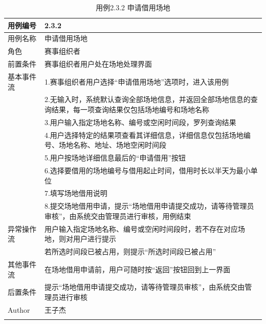 \documentclass[a4paper,UTF8]{article}
\begin{document}
\begin{table}[H]
	\begin{center}
		\caption{用例2.3.2 申请借用场地}
		\label{table:Tab_uc232}
		\begin{tabular}{|p{}|p{}|}
			\hline\noalign{\smallskip}
			用例编号 & 2.3.2\\
			\hline
			用例名称 &  申请借用场地\\
			\hline
			角色 & 赛事组织者\\
			\hline
			前置条件 & 赛事组织者用户处在场地处理界面\\
			\hline
			基本事件流 & 1.赛事组织者用户选择“申请借用场地”选项时，进入该用例 \\& 2.无输入时，系统默认查询全部场地信息，并返回全部场地信息的查询结果，每一项查询结果仅包括场地编号和场地名称 \\& 3.用户输入指定场地名称、编号或空闲时间段，罗列查询结果 \\& 4.用户选择特定的结果项查看其详细信息，详细信息仅包括场地编号、场地名称、地址、场地空闲时间段 \\& 5.用户按场地详细信息最后的“申请借用”按钮\\& 6.选择要借用的场地编号与借用起止时间，借用时长以半天为最小单位 \\& 7.填写场地借用说明 \\& 8.提交场地借用申请，提示“场地借用申请提交成功，请等待管理员审核”，由系统交由管理员进行审核，用例结束 \\
			\hline
			异常操作流 & 用户输入指定场地名称、编号或空闲时间段时，若不存在对应场地，则对用户进行提示  \\& 若所选时间段已被占用，则提示“所选时间段已被占用”\\
			\hline
			其他事件流 & 在场地借用申请前，用户可随时按“返回”按钮回到上一界面\\
			\hline
			后置条件 & 提示“场地借用申请提交成功，请等待管理员审核”，由系统交由管理员进行审核\\
			\hline
			Author & 王子杰 \\
			\noalign{\smallskip}
			\hline
			\noalign{\smallskip}
		\end{tabular}
	\end{center}
\end{table}
\end{document}
